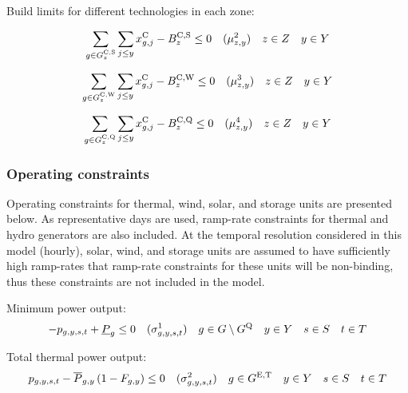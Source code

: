 \documentclass{article}
\newcommand{\sScenarioSets}{\quad  \iYear \in \sYears \quad  \iScenario \in \sScenarios \quad  \iInterval \in \sIntervals}
\begin{document}
Build limits for different technologies in each zone:

\begin{equation}
\sum\limits_{\iGenerator \in \sGeneratorsCandidateSolar_{\iZone}} \sum\limits_{\iYearAlias \leq \iYear} \vInstalledCapacity[\iGenerator,\iYearAlias] - \cBuildLimitSolar \leq 0 \quad (\dSolarBuildLimit) \quad  \iZone \in \sZones \quad  \iYear \in \sYears
\end{equation}

\begin{equation}
\sum\limits_{\iGenerator \in \sGeneratorsCandidateWind_{\iZone}} \sum\limits_{\iYearAlias \leq \iYear} \vInstalledCapacity[\iGenerator,\iYearAlias] - \cBuildLimitWind \leq 0 \quad (\dWindBuildLimit) \quad  \iZone \in \sZones \quad  \iYear \in \sYears 
\end{equation}

\begin{equation}
\sum\limits_{\iGenerator \in \sStorageCandidate_{\iZone}}  \sum\limits_{\iYearAlias \leq \iYear} \vInstalledCapacity[\iGenerator,\iYearAlias] - \cBuildLimitStorage \leq 0  \quad (\dStorageBuildLimit) \quad  \iZone \in \sZones \quad  \iYear \in \sYears
\label{eqn: storage build limits}
\end{equation}

\subsubsection{Operating constraints}
Operating constraints for thermal, wind, solar, and storage units are presented below. As representative days are used, ramp-rate constraints for thermal and hydro generators are also included. At the temporal resolution considered in this model (hourly), solar, wind, and storage units are assumed to have sufficiently high ramp-rates that ramp-rate constraints for these units will be non-binding, thus these constraints are not included in the model.

Minimum power output:
\begin{equation}
	-\vPower + \cPowerOutputMin \leq 0 \quad (\dMinPowerOutput) \quad  \iGenerator \in \sGenerators \setminus \sStorage \sScenarioSets
\end{equation}

Total thermal power output:
\begin{equation}
	\vPower - \cPowerOutputMax \left(1 - \cRetirementIndicator\right) \leq 0 \quad (\dMaxPowerOutputExistingThermal) \quad  \iGenerator \in \sGeneratorsExistingThermal \sScenarioSets
\end{equation}
\end{document}
